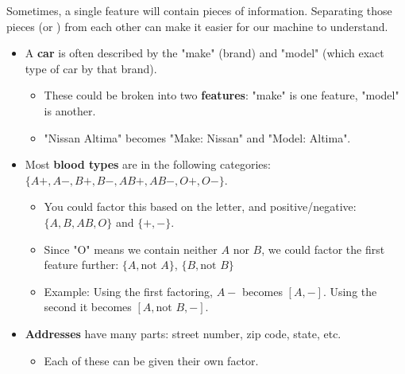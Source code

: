                 Sometimes, a single feature will contain  pieces of information. Separating those pieces (or ) from each other can make it easier for our machine to understand.

                \begin{itemize}
                    \item A \textbf{car} is often described by the "make" (brand) and "model" (which exact type of car by that brand). 
                        \begin{itemize}
                            \item These could be broken into two \textbf{features}: "make" is one feature, "model" is another.
                            \item \miniex "Nissan Altima" becomes "Make: Nissan" and "Model: Altima".
                        \end{itemize}
                        
                    \item Most \textbf{blood types} are in the following categories: $\{A+, A-, B+, B-, AB+, AB-, O+, O-\}$. 
                    \begin{itemize}
                        \item You could factor this based on the letter, and positive/negative: $\{A,B,AB,O\}$ and $\{+,-\}$.
                        \item Since "O" means we contain neither $A$ nor $B$, we could factor the first feature further: $\{A, \text{not } A\}$, $\{B, \text{not } B\}$
                        \item Example: Using the first factoring, $A-$ becomes $[A, -]$. Using the second it becomes $[A, \text{not } B, -]$. 
                    \end{itemize}

                    \item \textbf{Addresses} have many parts: street number, zip code, state, etc.
                        \begin{itemize}
                            \item Each of these can be given their own factor.\\
                        \end{itemize}
                \end{itemize}


